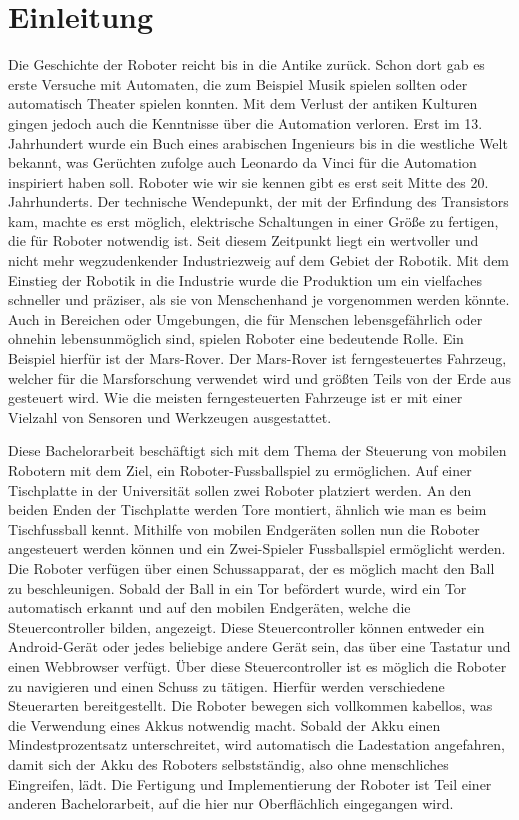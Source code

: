 \chapter{Einleitung}
\label{ch:einleitung}

Die Geschichte der Roboter reicht bis in die Antike zurück. Schon dort gab es erste Versuche mit Automaten, die zum Beispiel Musik spielen sollten oder automatisch Theater spielen konnten. Mit dem Verlust der antiken Kulturen gingen jedoch auch die Kenntnisse über die Automation verloren. Erst im 13. Jahrhundert wurde ein Buch eines arabischen Ingenieurs bis in die westliche Welt bekannt, was Gerüchten zufolge auch Leonardo da Vinci für die Automation inspiriert haben soll. 
Roboter wie wir sie kennen gibt es erst seit Mitte des 20. Jahrhunderts. Der technische Wendepunkt, der mit der Erfindung des Transistors kam, machte es erst möglich, elektrische Schaltungen in einer Größe zu fertigen, die für Roboter notwendig ist. Seit diesem Zeitpunkt liegt ein wertvoller und nicht mehr wegzudenkender Industriezweig auf dem Gebiet der Robotik. Mit dem Einstieg der Robotik in die Industrie wurde die Produktion um ein vielfaches schneller und präziser, als sie von Menschenhand je vorgenommen werden könnte. Auch in Bereichen oder Umgebungen, die für Menschen lebensgefährlich oder ohnehin lebensunmöglich sind, spielen Roboter eine bedeutende Rolle. Ein Beispiel hierfür ist der Mars-Rover. Der Mars-Rover ist ferngesteuertes Fahrzeug, welcher für die Marsforschung verwendet wird und größten Teils von der Erde aus gesteuert wird. Wie die meisten ferngesteuerten Fahrzeuge ist er mit einer Vielzahl von Sensoren und Werkzeugen ausgestattet. 

Diese Bachelorarbeit beschäftigt sich mit dem Thema der Steuerung von mobilen Robotern mit dem Ziel, ein Roboter-Fussballspiel zu ermöglichen. Auf einer Tischplatte in der Universität sollen zwei Roboter platziert werden. An den beiden Enden der Tischplatte werden Tore montiert, ähnlich wie man es beim Tischfussball kennt. Mithilfe von mobilen Endgeräten sollen nun die Roboter angesteuert werden können und ein Zwei-Spieler Fussballspiel ermöglicht werden. Die Roboter verfügen über einen Schussapparat, der es möglich macht den Ball zu beschleunigen. Sobald der Ball in ein Tor befördert wurde, wird ein Tor automatisch erkannt und auf den mobilen Endgeräten, welche die Steuercontroller bilden, angezeigt. Diese Steuercontroller können entweder ein Android-Gerät oder jedes beliebige andere Gerät sein, das über eine Tastatur und einen Webbrowser verfügt. Über diese Steuercontroller ist es möglich die Roboter zu navigieren und einen Schuss zu tätigen. Hierfür werden verschiedene Steuerarten bereitgestellt. 
Die Roboter bewegen sich vollkommen kabellos, was die Verwendung eines Akkus notwendig macht. Sobald der Akku einen Mindestprozentsatz unterschreitet, wird automatisch die Ladestation angefahren, damit sich der Akku des Roboters selbstständig, also ohne menschliches Eingreifen, lädt.
Die Fertigung und Implementierung der Roboter ist Teil einer anderen Bachelorarbeit, auf die hier nur Oberflächlich eingegangen wird.               

